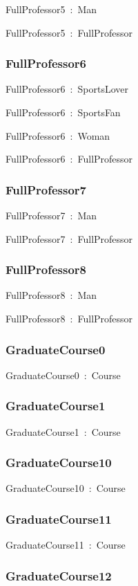 \documentclass{article}
\begin{document}
FullProfessor5~:~Man

FullProfessor5~:~FullProfessor

\subsubsection*{FullProfessor6}

FullProfessor6~:~SportsLover

FullProfessor6~:~SportsFan

FullProfessor6~:~Woman

FullProfessor6~:~FullProfessor

\subsubsection*{FullProfessor7}

FullProfessor7~:~Man

FullProfessor7~:~FullProfessor

\subsubsection*{FullProfessor8}

FullProfessor8~:~Man

FullProfessor8~:~FullProfessor

\subsubsection*{GraduateCourse0}

GraduateCourse0~:~Course

\subsubsection*{GraduateCourse1}

GraduateCourse1~:~Course

\subsubsection*{GraduateCourse10}

GraduateCourse10~:~Course

\subsubsection*{GraduateCourse11}

GraduateCourse11~:~Course

\subsubsection*{GraduateCourse12}
\end{document}

